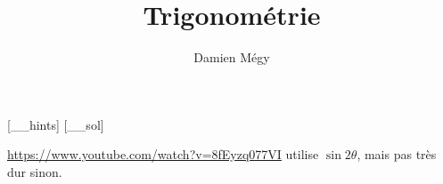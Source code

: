 




[_\jobname_hints]
[_\jobname_sol]


\title{Trigonométrie}
\author{Damien Mégy}
\maketitle

\avertissement 


\tableofcontents
\begin{exo}
\url{https://www.youtube.com/watch?v=8fEyzq077VI}
utilise $\sin 2\theta$, mais pas très dur sinon.
\end{exo}




\indications
\correction



